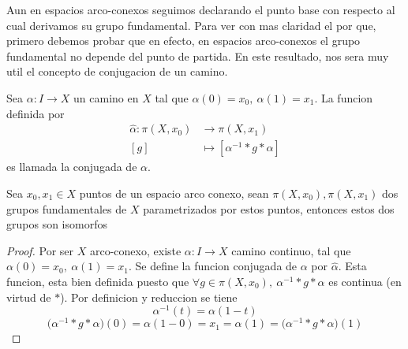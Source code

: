 {Aun en espacios arco-conexos seguimos declarando el punto base con
respecto al cual derivamos su grupo fundamental. Para ver con mas
claridad el por que, primero debemos probar que en efecto, en espacios
arco-conexos el grupo fundamental no depende del punto de partida. En
este resultado, nos sera muy util el concepto de conjugacion de un
camino.
\begin{definicion} \label{def:conjugada}
  Sea \(\alpha : I \to X\) un camino en \(X\) tal que \(\alpha (0) =
  x_0,\ \alpha(1) = x_1\). La funcion definida por
  \begin{align*}
    \hat \alpha : \pi (X, x_0) &\longrightarrow \pi (X, x_1) \\
    [g] &\longmapsto [ \alpha^{-1} * g * \alpha ]
  \end{align*}
  es llamada la conjugada de \(\alpha\).
\end{definicion}
\begin{teorema} \label{not:alpha-hat}
  Sea \(x_0 , x_1 \in X\) puntos de un espacio arco conexo, sean \(\pi
  (X, x_0), \pi (X, x_1)\) dos grupos fundamentales de \(X\)
  parametrizados por estos puntos, entonces estos dos grupos son isomorfos
\end{teorema}
\begin{proof}
  Por ser \(X\) arco-conexo, existe \(\alpha : I \to X\) camino
  continuo, tal que \(\alpha (0) = x_0,\ \alpha (1) = x_1\). Se define
  la funcion conjugada de \(\alpha\) por \(\hat \alpha\).
  Esta funcion, esta bien definida puesto que \(\forall g \in \pi (X,
  x_0),\ \alpha^{-1} * g * \alpha \) es continua (en virtud de \(*\)).
  Por definicion y reduccion se tiene
  \[ \alpha^{-1} (t) = \alpha (1 - t)\]
  \[\big(\alpha^{-1} * g * \alpha \big) (0) = \alpha (1 - 0) = x_1 = \alpha (1) =
    \big(\alpha^{-1} * g * \alpha \big) (1)\]


\end{proof}}
